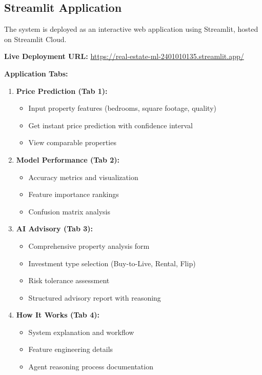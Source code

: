 \documentclass[11pt,a4paper]{article}
\begin{document}
\subsection{Streamlit Application}

The system is deployed as an interactive web application using Streamlit, hosted on Streamlit Cloud.

\textbf{Live Deployment URL:} \url{https://real-estate-ml-2401010135.streamlit.app/}

\textbf{Application Tabs:}

\begin{enumerate}
    \item \textbf{Price Prediction (Tab 1):} 
    \begin{itemize}
        \item Input property features (bedrooms, square footage, quality)
        \item Get instant price prediction with confidence interval
        \item View comparable properties
    \end{itemize}
    
    \item \textbf{Model Performance (Tab 2):}
    \begin{itemize}
        \item Accuracy metrics and visualization
        \item Feature importance rankings
        \item Confusion matrix analysis
    \end{itemize}
    
    \item \textbf{AI Advisory (Tab 3):}
    \begin{itemize}
        \item Comprehensive property analysis form
        \item Investment type selection (Buy-to-Live, Rental, Flip)
        \item Risk tolerance assessment
        \item Structured advisory report with reasoning
    \end{itemize}
    
    \item \textbf{How It Works (Tab 4):}
    \begin{itemize}
        \item System explanation and workflow
        \item Feature engineering details
        \item Agent reasoning process documentation
    \end{itemize}
\end{enumerate}
\end{document}
